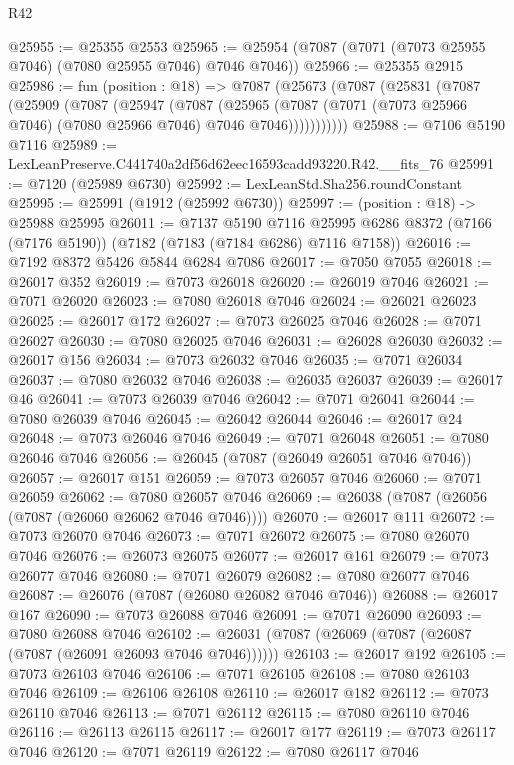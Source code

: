 \begin{lexlean}{R42}
\begin{coremodule}
{@25955 := @25355 @2553
@25965 := @25954 (@7087 (@7071 (@7073 @25955 @7046) (@7080 @25955 @7046) @7046 @7046))
@25966 := @25355 @2915
@25986 := fun (position : @18) =>
  @7087
    (@25673
      (@7087
        (@25831
          (@7087
            (@25909
              (@7087
                (@25947
                  (@7087
                    (@25965
                      (@7087 (@7071 (@7073 @25966 @7046) (@7080 @25966 @7046) @7046 @7046)))))))))))
@25988 := @7106 @5190 @7116
@25989 := LexLeanPreserve.C441740a2df56d62eec16593cadd93220.R42.__fits_76
@25991 := @7120 (@25989 @6730)
@25992 := LexLeanStd.Sha256.roundConstant
@25995 := @25991 (@1912 (@25992 @6730))
@25997 := (position : @18) -> @25988 @25995
@26011 := @7137
    @5190
    @7116
    @25995
    @6286
    @8372
    (@7166 (@7176 @5190))
    (@7182 (@7183 (@7184 @6286) @7116 @7158))
@26016 := @7192 @8372 @5426 @5844 @6284 @7086
@26017 := @7050 @7055
@26018 := @26017 @352
@26019 := @7073 @26018
@26020 := @26019 @7046
@26021 := @7071 @26020
@26023 := @7080 @26018 @7046
@26024 := @26021 @26023
@26025 := @26017 @172
@26027 := @7073 @26025 @7046
@26028 := @7071 @26027
@26030 := @7080 @26025 @7046
@26031 := @26028 @26030
@26032 := @26017 @156
@26034 := @7073 @26032 @7046
@26035 := @7071 @26034
@26037 := @7080 @26032 @7046
@26038 := @26035 @26037
@26039 := @26017 @46
@26041 := @7073 @26039 @7046
@26042 := @7071 @26041
@26044 := @7080 @26039 @7046
@26045 := @26042 @26044
@26046 := @26017 @24
@26048 := @7073 @26046 @7046
@26049 := @7071 @26048
@26051 := @7080 @26046 @7046
@26056 := @26045 (@7087 (@26049 @26051 @7046 @7046))
@26057 := @26017 @151
@26059 := @7073 @26057 @7046
@26060 := @7071 @26059
@26062 := @7080 @26057 @7046
@26069 := @26038 (@7087 (@26056 (@7087 (@26060 @26062 @7046 @7046))))
@26070 := @26017 @111
@26072 := @7073 @26070 @7046
@26073 := @7071 @26072
@26075 := @7080 @26070 @7046
@26076 := @26073 @26075
@26077 := @26017 @161
@26079 := @7073 @26077 @7046
@26080 := @7071 @26079
@26082 := @7080 @26077 @7046
@26087 := @26076 (@7087 (@26080 @26082 @7046 @7046))
@26088 := @26017 @167
@26090 := @7073 @26088 @7046
@26091 := @7071 @26090
@26093 := @7080 @26088 @7046
@26102 := @26031 (@7087 (@26069 (@7087 (@26087 (@7087 (@26091 @26093 @7046 @7046))))))
@26103 := @26017 @192
@26105 := @7073 @26103 @7046
@26106 := @7071 @26105
@26108 := @7080 @26103 @7046
@26109 := @26106 @26108
@26110 := @26017 @182
@26112 := @7073 @26110 @7046
@26113 := @7071 @26112
@26115 := @7080 @26110 @7046
@26116 := @26113 @26115
@26117 := @26017 @177
@26119 := @7073 @26117 @7046
@26120 := @7071 @26119
@26122 := @7080 @26117 @7046
}
\end{coremodule}
\end{lexlean}
